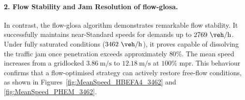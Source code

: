 \paragraph{2. Flow Stability and Jam Resolution of \ac{flow-glosa}.}
In contrast, the \ac{flow-glosa} algorithm demonstrates remarkable flow stability. It successfully maintains near-Standard speeds for demands up to $2769~\unit{\veh\per\hour}$. Under fully saturated conditions ($3462~\unit{\veh\per\hour}$), it proves capable of dissolving the traffic jam once penetration exceeds approximately $80\%$. The mean speed increases from a gridlocked $3.86~\unit{\metre\per\second}$ to $12.18~\unit{\metre\per\second}$ at $100\%$ \ac{mpr}. This behaviour confirms that a flow-optimised strategy can actively restore free-flow conditions, as shown in Figures~\vref{fig:MeanSpeed_HBEFA4_3462} and \vref{fig:MeanSpeed_PHEM_3462}.


